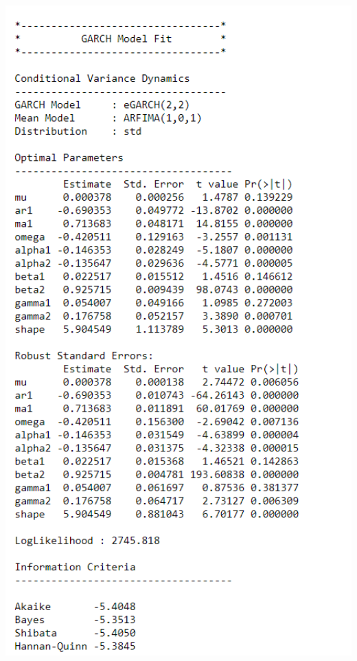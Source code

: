 \documentclass[
  12pt,
  a4paper,
  openany]{book}
\theoremstyle{definition}
\theoremstyle{definition}
\theoremstyle{definition}
\theoremstyle{remark}
\begin{document}
\begin{center}
\begin{minipage}{0.90\linewidth}
    \centering
    \includegraphics[width=2\textwidth]{image/air1.png}
\end{minipage}
\end{center}

\newpage
\end{document}
